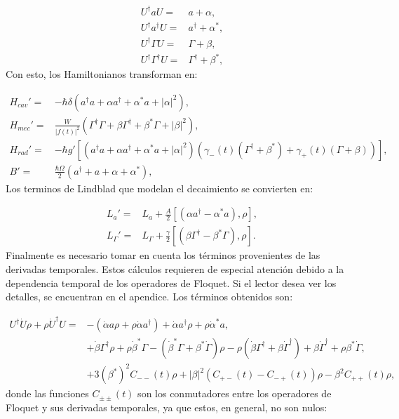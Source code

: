 \documentclass[a4paper,10pt]{report}
\begin{document}
\begin{align}
U^{\dagger} a U =& a + \alpha, \\
U^{\dagger} a^{\dagger} U =& a^{\dagger} + \alpha^*, \\
U^{\dagger} \Gamma U =& \Gamma + \beta, \\
U^{\dagger} \Gamma^{\dagger} U =& \Gamma^{\dagger} + \beta^*, 
\end{align} Con esto, los Hamiltonianos transforman en:

\begin{align}
H_{cav}' =& -\hbar \delta(a^{\dagger}a +\alpha a^{\dagger}+\alpha^* a + |\alpha|^2),\\
H_{mec}' =& \frac{W}{|f(t)|^2}(\Gamma^{\dagger}\Gamma + \beta \Gamma^{\dagger} + \beta^* \Gamma + |\beta|^2 ),\\
H_{rad}'=&-\hbar g'[(a^{\dagger}a +\alpha a^{\dagger}+\alpha^* a + |\alpha|^2)(\gamma_-(t)(\Gamma^{\dagger}+\beta^*)+\gamma_+(t)(\Gamma+\beta))],\\
B' =& \frac{\hbar \Omega}{2}(a^{\dagger} + a +\alpha + \alpha^*),
\end{align}Los terminos de Lindblad que modelan el decaimiento se convierten en:

\begin{align}
L_a ' =& L_a + \frac{A}{2}[(\alpha a^\dagger - \alpha^*a),\rho], \\
L_{\Gamma}' =& L_{\Gamma} + \frac{\gamma}{2}[(\beta\Gamma^{\dagger}-\beta^* \Gamma),\rho].
\end{align}Finalmente es necesario tomar en cuenta los términos provenientes de las derivadas temporales. Estos cálculos requieren de especial atención debido a la dependencia temporal de los operadores de Floquet. Si el lector desea ver los detalles, se encuentran en el apendice. Los términos obtenidos son:

\begin{align*}
U^{\dagger}\dot{U}\rho + \rho \dot{U}^\dagger U =& -(\dot{\alpha}a \rho + \rho\dot{\alpha}a^{\dagger}) + \dot{\alpha}a^{\dagger}\rho + \rho \dot{\alpha}^*a,\\
&+ \dot{\beta}\Gamma^{\dagger}\rho + \rho\dot{\beta}^*\Gamma-(\dot{\beta}^*\Gamma + \beta^*\dot{\Gamma})\rho - \rho(\dot{\beta} \Gamma^{\dagger} + \beta \dot{\Gamma}^{\dagger}) +\beta \dot{\Gamma}^{\dagger} + \rho\beta^* \dot{\Gamma},\\
&+3(\beta^*)^2C_{--}(t)\rho + |\beta|^2(C_{+-}(t) - C_{-+}(t))\rho -  \beta^2 C_{++}(t)\rho,
\end{align*} donde las funciones $C_{\pm \pm}(t)$ son los conmutadores entre los operadores de Floquet y sus derivadas temporales, ya que estos, en general, no son nulos:
\end{document}

